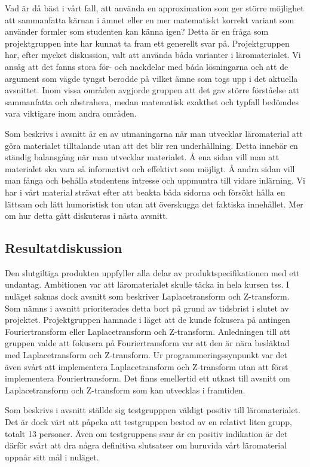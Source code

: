\documentclass[12pt,a4paper,twoside,openright]{article}
\begin{document}
Vad är då bäst i vårt fall, att använda en approximation som ger
större möjlighet att
sammanfatta kärnan i ämnet eller en mer matematiskt korrekt variant
som använder formler som studenten kan känna igen? Detta är en fråga
som projektgruppen inte har kunnat ta fram ett generellt svar
på. Projektgruppen har, efter mycket diskussion, valt att använda båda
varianter i läromaterialet. Vi ansåg att det fanns stora för- och
nackdelar med båda lösningarna och att de argument som vägde tyngst
berodde på vilket ämne som togs upp i det aktuella avsnittet. Inom
vissa områden avgjorde gruppen att det gav större förståelse att
sammanfatta och abstrahera, medan matematisk exakthet och typfall
bedömdes vara viktigare inom andra områden.

Som beskrivs i avsnitt  är en av utmaningarna
när man utvecklar läromaterial att göra materialet tilltalande utan
att det blir ren underhållning. Detta innebär en ständig balansgång
när man utvecklar materialet. Å ena sidan vill man att materialet ska
vara så informativt och effektivt som möjligt. Å andra sidan vill man
fånga och behålla studentens intresse och uppmuntra till vidare
inlärning. Vi har i vårt material strävat efter att beakta båda
sidorna och försökt hålla en lättsam och lätt humoristisk ton utan att
överskugga det faktiska innehållet. Mer om hur detta gått diskuteras i
nästa avsnitt.

\subsection{Resultatdiskussion}
\label{sec:resDisk}
Den slutgiltiga produkten uppfyller alla delar av
produktspecifikationen med ett undantag. Ambitionen var att
läromaterialet skulle täcka in hela kursen \gls{tss}. I nuläget saknas
dock avsnitt som beskriver Laplacetransform och Z-transform. Som nämns
i avsnitt  prioriterades detta bort på grund
av tidsbrist i slutet av projektet. Projektgruppen hamnade i läget att
de kunde fokusera på antingen Fouriertransform eller Laplacetransform
och Z-transform. Anledningen till att gruppen valde att fokusera på
Fouriertransform var att den är nära besläktad med Laplacetransform
och Z-transform. Ur programmeringssynpunkt var det även svårt att
implementera Laplacetransform och Z-transform utan att först
implementera Fouriertransform. Det finns emellertid ett utkast till
avsnitt om Laplacetransform och Z-transform som kan utvecklas i
framtiden.

Som beskrivs i avsnitt  ställde sig testgrupppen
väldigt positiv till läromaterialet. Det är dock värt att påpeka att
testgruppen bestod av en relativt liten grupp, totalt 13 personer.
Även om testgruppens svar är en positiv indikation är det därför svårt
att dra några definitiva slutsatser om huruvida vårt läromaterial
uppnår sitt mål i nuläget.
\end{document}
